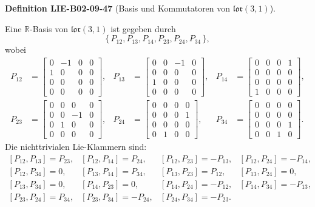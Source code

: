 \documentclass[10pt, letterpaper]{article}
\newcommand{\CustomHeading}[3]{%
  \par\medskip\noindent%
  \textbf{#1 #2} \textnormal{(#3)}.\enskip%
}
\newenvironment{DEF}[2]{\begin{unitbox}\CustomHeading{Definition}{#1}{#2}}{\end{unitbox}}
\begin{document}
\begin{DEF}{LIE-B02-09-47}{Basis und Kommutatoren von \(\mathfrak{lor}(3,1)\)}
Eine \(\mathbb{R}\)-Basis von \(\mathfrak{lor}(3,1)\) ist gegeben durch
\[
\{\,P_{12},P_{13},P_{14},P_{23},P_{24},P_{34}\,\},
\]
wobei
\[
\begin{aligned}
P_{12}&=\begin{bmatrix}0&-1&0&0\\ 1&0&0&0\\ 0&0&0&0\\ 0&0&0&0\end{bmatrix},&
P_{13}&=\begin{bmatrix}0&0&-1&0\\ 0&0&0&0\\ 1&0&0&0\\ 0&0&0&0\end{bmatrix},&
P_{14}&=\begin{bmatrix}0&0&0&1\\ 0&0&0&0\\ 0&0&0&0\\ 1&0&0&0\end{bmatrix},\\[2mm]
P_{23}&=\begin{bmatrix}0&0&0&0\\ 0&0&-1&0\\ 0&1&0&0\\ 0&0&0&0\end{bmatrix},&
P_{24}&=\begin{bmatrix}0&0&0&0\\ 0&0&0&1\\ 0&0&0&0\\ 0&1&0&0\end{bmatrix},&
P_{34}&=\begin{bmatrix}0&0&0&0\\ 0&0&0&0\\ 0&0&0&1\\ 0&0&1&0\end{bmatrix}.
\end{aligned}
\]
Die nichttrivialen Lie-Klammern sind:
\[
\begin{array}{llll}
[P_{12},P_{13}]=P_{23}, & [P_{12},P_{14}]=P_{24}, & [P_{12},P_{23}]=-P_{13}, & [P_{12},P_{24}]=-P_{14},\\[1mm]
[P_{12},P_{34}]=0, & [P_{13},P_{14}]=P_{34}, & [P_{13},P_{23}]=P_{12}, & [P_{13},P_{24}]=0,\\[1mm]
[P_{13},P_{34}]=0, & [P_{14},P_{23}]=0, & [P_{14},P_{24}]=-P_{12}, & [P_{14},P_{34}]=-P_{13},\\[1mm]
[P_{23},P_{24}]=P_{34}, & [P_{23},P_{34}]=-P_{24}, & [P_{24},P_{34}]=-P_{23}. &
\end{array}
\]


\end{DEF}
\end{document}
